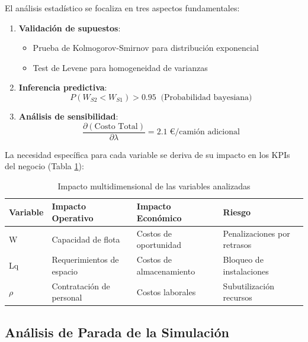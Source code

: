 \documentclass[a4paper, 12pt]{article}
\begin{document}
  El análisis estadístico se focaliza en tres aspectos fundamentales:
  
  \begin{enumerate}
  	\item \textbf{Validación de supuestos}:
  	\begin{itemize}
  		\item Prueba de Kolmogorov-Smirnov para distribución exponencial
  		\item Test de Levene para homogeneidad de varianzas
  	\end{itemize}
  	
  	\item \textbf{Inferencia predictiva}:
  	\begin{equation}
  		P(W_{S2} < W_{S1}) > 0.95\;\;\text{(Probabilidad bayesiana)}
  	\end{equation}
  	
  	\item \textbf{Análisis de sensibilidad}:
  	\begin{equation}
  		\frac{\partial(\text{Costo Total})}{\partial \lambda} = 2.1\;\text{€/camión adicional}
  	\end{equation}
  \end{enumerate}
  
  La necesidad específica para cada variable se deriva de su impacto en los KPIs del negocio (Tabla \ref{tab:impacto}):
  
  \begin{table}[H]
  	\centering
  	\begin{tabular}{lp{3cm}p{3cm}p{3cm}}
  		\toprule
  		\textbf{Variable} & \textbf{Impacto Operativo} & \textbf{Impacto Económico} & \textbf{Riesgo} \\
  		\midrule
  		W & Capacidad de flota & Costos de oportunidad & Penalizaciones por retrasos \\
  		Lq & Requerimientos de espacio & Costos de almacenamiento & Bloqueo de instalaciones \\
  		$\rho$ & Contratación de personal & Costos laborales & Subutilización recursos \\
  		\bottomrule
  	\end{tabular}
  	\caption{Impacto multidimensional de las variables analizadas}
  	\label{tab:impacto}
  \end{table}
  
  
  \subsection{Análisis de Parada de la Simulación} 
  \label{subsec:parada}
  
\end{document}
